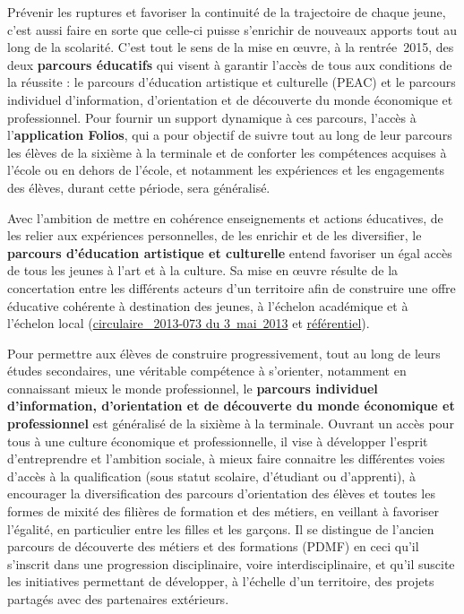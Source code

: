 Prévenir les ruptures et favoriser la continuité de la trajectoire de chaque jeune, c’est aussi faire en sorte que celle-ci puisse s’enrichir de nouveaux apports tout au long de la scolarité. C’est tout le sens de la mise en œuvre, à la rentrée~2015, des deux \textbf{parcours éducatifs} qui visent à garantir l’accès de tous aux conditions de la réussite : le parcours d’éducation artistique et culturelle (PEAC) et le parcours individuel d’information, d’orientation et de découverte du monde économique et professionnel. Pour fournir un support dynamique à ces parcours, l’accès à l’\textbf{application Folios}, qui a pour objectif de suivre tout au long de leur parcours les élèves de la sixième à la terminale et de conforter les compétences acquises à l’école ou en dehors de l’école, et notamment les expériences et les engagements des élèves, durant cette période, sera généralisé.

Avec l’ambition de mettre en cohérence enseignements et actions éducatives, de les relier aux expériences personnelles, de les enrichir et de les diversifier, le \textbf{parcours d’éducation artistique et culturelle} entend favoriser un égal accès de tous les jeunes à l’art et à la culture. Sa mise en œuvre résulte de la concertation entre les différents acteurs d’un territoire afin de construire une offre éducative cohérente à destination des jeunes, à l’échelon académique et à l’échelon local (\href{http://www.education.gouv.fr/pid25535/bulletin_officiel.html?cid_bo=71673}{circulaire \no{}~2013-073 du 3~mai~2013} et \href{http://cache.media.education.gouv.fr/file/CSP/16/2/Projet_de_referentiel_pour_le_parcours_d_education_artistique_et_culturelle_379162.pdf}{référentiel}).

Pour permettre aux élèves de construire progressivement, tout au long de leurs études secondaires, une véritable compétence à s’orienter, notamment en connaissant mieux le monde professionnel, le \textbf{parcours individuel d’information, d’orientation et de découverte du monde économique et professionnel} est généralisé de la sixième à la terminale. Ouvrant un accès pour tous à une culture économique et professionnelle, il vise à développer l’esprit d’entreprendre et l’ambition sociale, à mieux faire connaitre les différentes voies d’accès à la qualification (sous statut scolaire, d’étudiant ou d’apprenti), à encourager la diversification des parcours d’orientation des élèves et toutes les formes de mixité des filières de formation et des métiers, en veillant à favoriser l’égalité, en particulier entre les filles et les garçons. Il se distingue de l’ancien parcours de découverte des métiers et des formations (PDMF) en ceci qu’il s’inscrit dans une progression disciplinaire, voire interdisciplinaire, et qu’il suscite les initiatives permettant de développer, à l’échelle d’un territoire, des projets partagés avec des partenaires extérieurs.

